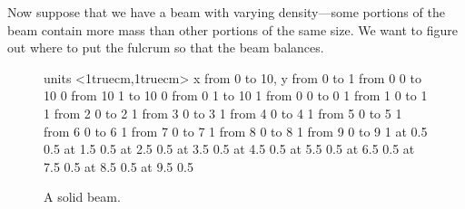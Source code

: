 Now suppose that we have a beam with varying density---some portions
of the beam contain more mass than other portions of the same size. We
want to figure out where to put the fulcrum so that the beam balances.

\begin{figure}[H]
\centerline{
\vbox{\beginpicture
\normalgraphs
\setcoordinatesystem units <1truecm,1truecm>
\setplotarea x from 0 to 10, y from 0 to 1
\putrule from 0 0 to 10 0
\putrule from 10 1 to 10 0
\putrule from 0 1 to 10 1
\putrule from 0 0 to 0 1
\putrule from 1 0 to 1 1
\putrule from 2 0 to 2 1
\putrule from 3 0 to 3 1
\putrule from 4 0 to 4 1
\putrule from 5 0 to 5 1
\putrule from 6 0 to 6 1
\putrule from 7 0 to 7 1
\putrule from 8 0 to 8 1
\putrule from 9 0 to 9 1
 at 0.5 0.5
 at 1.5 0.5
 at 2.5 0.5
 at 3.5 0.5
 at 4.5 0.5
 at 5.5 0.5
 at 6.5 0.5
 at 7.5 0.5
 at 8.5 0.5
 at 9.5 0.5
\endpicture}}
\caption{A solid beam.}
\label{fig:solidbeam}
\end{figure}

